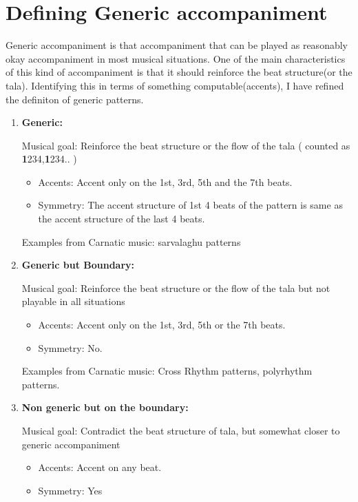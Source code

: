 
\section{Defining Generic accompaniment}

Generic accompaniment is that accompaniment that can be played as reasonably okay accompaniment in most musical situations. One of the main characteristics of this kind of accompaniment is that it should reinforce the beat structure(or the tala). Identifying this in terms of something computable(accents), I have refined the definiton of generic patterns. 

\begin{enumerate}

\item \textbf{Generic:}

Musical goal: Reinforce the beat structure or the flow of the tala ( counted as \textbf{1}234,\textbf{1}234..  )

\begin{itemize}
\item Accents:  Accent only on the 1st, 3rd, 5th and the 7th beats.
\item Symmetry: The accent structure of 1st 4 beats of the pattern is same as the accent structure of the last 4 beats.
\end{itemize}

Examples from Carnatic music: sarvalaghu patterns

\item \textbf{Generic but Boundary:}

Musical goal: Reinforce the beat structure or the flow of the tala but not playable in all situations

\begin{itemize}
\item Accents:  Accent only on the 1st, 3rd, 5th or the 7th beats.
\item Symmetry: No.
\end{itemize}

Examples from Carnatic music: Cross Rhythm patterns, polyrhythm patterns.

\item \textbf{Non generic but on the boundary:}

Musical goal: Contradict the beat structure of tala, but somewhat closer to generic accompaniment

\begin{itemize}
\item Accents:  Accent on any beat.
\item Symmetry: Yes
\end{itemize}


\end{enumerate}
